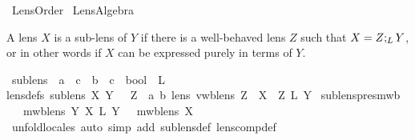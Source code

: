 %
\begin{isabellebody}%
%
%
\isamarkuptrue%
%
\isadelimtheory
%
\endisadelimtheory
%
\isatagtheory
{}\isamarkupfalse%
\ Lens{\isacharunderscore}Order\isanewline
{}\ Lens{\isacharunderscore}Algebra\isanewline
{}%
\endisatagtheory
{\isafoldtheory}%
%
\isadelimtheory
%
\endisadelimtheory
%
\begin{isamarkuptext}%
A lens $X$ is a sub-lens of $Y$ if there is a well-behaved lens $Z$ such that $X = Z ;_{L} Y$,
  or in other words if $X$ can be expressed purely in terms of $Y$.%
\end{isamarkuptext}\isamarkuptrue%
\isamarkupfalse%
\ sublens\ {\isacharcolon}{\isacharcolon}\ {\isachardoublequoteopen}{\isacharparenleft}{\isacharprime}a\ {\isasymLongrightarrow}\ {\isacharprime}c{\isacharparenright}\ {\isasymRightarrow}\ {\isacharparenleft}{\isacharprime}b\ {\isasymLongrightarrow}\ {\isacharprime}c{\isacharparenright}\ {\isasymRightarrow}\ bool{\isachardoublequoteclose}\ {\isacharparenleft}\ {\isachardoublequoteopen}{\isasymsubseteq}\isactrlsub L{\isachardoublequoteclose}\ {}{}{\isacharparenright}\ \isanewline
{\isacharbrackleft}lens{\isacharunderscore}defs{\isacharbrackright}{\isacharcolon}\ {\isachardoublequoteopen}sublens\ X\ Y\ {\isacharequal}\ {\isacharparenleft}{\isasymexists}\ Z\ {\isacharcolon}{\isacharcolon}\ {\isacharparenleft}{\isacharprime}a{\isacharcomma}\ {\isacharprime}b{\isacharparenright}\ lens{\isachardot}\ vwb{\isacharunderscore}lens\ Z\ {\isasymand}\ X\ {\isacharequal}\ Z\ {\isacharsemicolon}\isactrlsub L\ Y{\isacharparenright}{\isachardoublequoteclose}\isanewline
\isanewline
{}\isamarkupfalse%
\ sublens{\isacharunderscore}pres{\isacharunderscore}mwb{\isacharcolon}\isanewline
\ \ {\isachardoublequoteopen}{\isasymlbrakk}\ mwb{\isacharunderscore}lens\ Y{\isacharsemicolon}\ X\ {\isasymsubseteq}\isactrlsub L\ Y\ {\isasymrbrakk}\ {\isasymLongrightarrow}\ mwb{\isacharunderscore}lens\ X{\isachardoublequoteclose}\isanewline
%
\isadelimproof
\ \ %
\endisadelimproof
%
\isatagproof
{}\isamarkupfalse%
\ {\isacharparenleft}unfold{\isacharunderscore}locales{\isacharcomma}\ auto\ simp\ add{\isacharcolon}\ sublens{\isacharunderscore}def\ lens{\isacharunderscore}comp{\isacharunderscore}def{\isacharparenright}%
\endisatagproof
{\isafoldproof}%
%
\isadelimproof
\isanewline
%
\endisadelimproof

\end{isabellebody}
